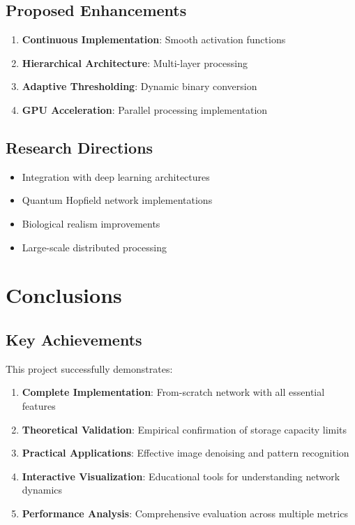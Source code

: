 \documentclass[11pt,a4paper]{article}
\begin{document}
\subsection{Proposed Enhancements}

\begin{enumerate}
    \item \textbf{Continuous Implementation}: Smooth activation functions
    \item \textbf{Hierarchical Architecture}: Multi-layer processing
    \item \textbf{Adaptive Thresholding}: Dynamic binary conversion
    \item \textbf{GPU Acceleration}: Parallel processing implementation
\end{enumerate}

\subsection{Research Directions}

\begin{itemize}
    \item Integration with deep learning architectures
    \item Quantum Hopfield network implementations
    \item Biological realism improvements
    \item Large-scale distributed processing
\end{itemize}

\section{Conclusions}

\subsection{Key Achievements}

This project successfully demonstrates:

\begin{enumerate}
    \item \textbf{Complete Implementation}: From-scratch network with all essential features
    \item \textbf{Theoretical Validation}: Empirical confirmation of storage capacity limits
    \item \textbf{Practical Applications}: Effective image denoising and pattern recognition
    \item \textbf{Interactive Visualization}: Educational tools for understanding network dynamics
    \item \textbf{Performance Analysis}: Comprehensive evaluation across multiple metrics
\end{enumerate}
\end{document}
